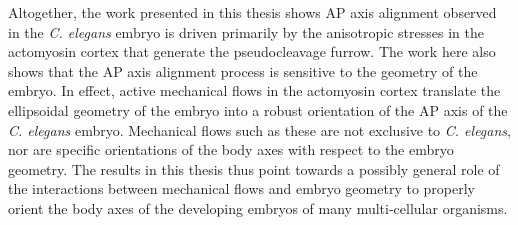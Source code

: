 \documentclass[a4paper]{article}
\begin{document}
Altogether, the work presented in this thesis shows AP axis alignment observed in the \textit{C. elegans} embryo is driven primarily by the anisotropic stresses in the actomyosin cortex that generate the pseudocleavage furrow. The work here also shows that the AP axis alignment process is sensitive to the geometry of the embryo. In effect, active mechanical flows in the actomyosin cortex translate the ellipsoidal geometry of the embryo into a robust orientation of the AP axis of the \textit{C. elegans} embryo. Mechanical flows such as these are not exclusive to \textit{C. elegans}, nor are specific orientations of the body axes with respect to the embryo geometry. The results in this thesis thus point towards a possibly general role of the interactions between mechanical flows and embryo geometry to properly orient the body axes of the developing embryos of many multi-cellular organisms.
\end{document}
